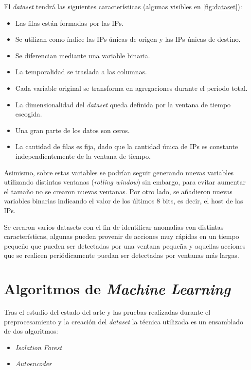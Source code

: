 El \textit{dataset} tendrá las siguientes características (algunas visibles en \ref{fig:dataset}):
\begin{itemize}
    \item Las filas están formadas por las IPs.
    \item Se utilizan como índice las IPs únicas de origen y las IPs únicas de destino.
    \item Se diferencian mediante una variable binaria.
    \item La temporalidad se traslada a las columnas.
    \item Cada variable original se transforma en agregaciones durante el periodo total.
    \item La dimensionalidad del \textit{dataset} queda definida por la ventana de tiempo escogida.
    \item Una gran parte de los datos son ceros.
    \item La cantidad de filas es fija, dado que la cantidad única de IPs es constante independientemente de la ventana de tiempo.
\end{itemize}

Asimismo, sobre estas variables se podrían seguir generando nuevas variables utilizando distintas ventanas (\textit{rolling window}) sin embargo, para evitar aumentar el tamaño no se crearon nuevas ventanas. Por otro lado, se añadieron nuevas variables binarias indicando el valor de los últimos 8 bits, es decir, el host de las IPs. 

Se crearon varios datasets con el fin de identificar anomalías con distintas características, algunas pueden provenir de acciones muy rápidas en un tiempo pequeño que pueden ser detectadas por una ventana pequeña y aquellas acciones que se realicen periódicamente puedan ser detectadas por ventanas más largas.
\newpage

\section{Algoritmos de \textit{Machine Learning}}

Tras el estudio del estado del arte y las pruebas realizadas durante el preprocesamiento y la creación del \textit{dataset} la técnica utilizada es un ensamblado de dos algoritmos:
\begin{itemize}
    \item \textit{Isolation Forest}
    \item \textit{Autoencoder}
\end{itemize}

